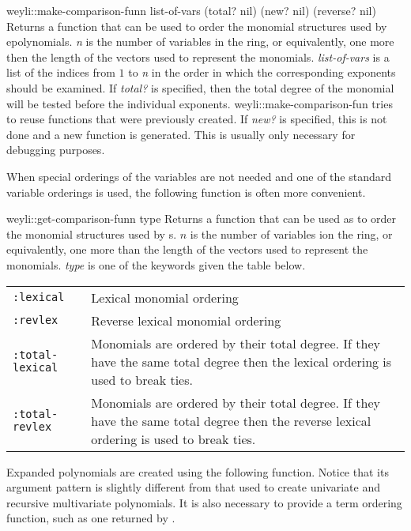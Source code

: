 \begin{functiondef}{weyli::make-comparison-fun}{n list-of-vars \key
(total? nil) (new? nil) (reverse? nil)} 
Returns a function that can be used to order the monomial structures
used by epolynomials.  {\em n} is the number of variables in the ring, or
equivalently, one more then the length of the vectors used to
represent the monomials.  {\em list-of-vars} is a list of the indices from $1$
to {\em n} in the order in which the corresponding exponents should be
examined. If {\em total?} is specified, then the total degree of the
monomial will be tested before the individual exponents.  {\sf
weyli::make-comparison-fun} tries to reuse functions that  were
previously created. If {\em new?} is specified, this is not done and a
new function is generated. This is usually only necessary for
debugging purposes. 
\end{functiondef}

When special orderings of the variables are not needed and one of the
standard variable orderings is used, the following function is often
more convenient.

\begin{functiondef}{weyli::get-comparison-fun}{n type}
Returns a function that can be used as to order the monomial
structures used by s.  $n$ is the number of
variables ion the ring, or equivalently, one more than the length of
the vectors used to represent the monomials.  {\em type} is one of the
keywords given the table below.
\begin{center}
\begin{tabular}{lp{4in}}
{\tt :lexical} & Lexical monomial ordering \\
{\tt :revlex} & Reverse lexical monomial ordering \\
{\tt :total-lexical} & Monomials are ordered by their total degree.
If they have the same total degree then the lexical ordering is used
to break ties. \\
{\tt :total-revlex} & Monomials are ordered by their total degree.
If they have the same total degree then the reverse  lexical ordering
is used to break ties. 
\end{tabular}
\end{center}
\end{functiondef}

Expanded polynomials are created using the following function.  Notice
that its argument pattern is slightly different from that used to
create univariate and recursive multivariate polynomials.  It is also
necessary to provide a term ordering function, such as one returned by
.

